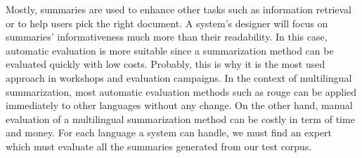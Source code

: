 Mostly, summaries are used to enhance other tasks such as information retrieval or to help users pick the right document. 
A system's designer will focus on summaries' informativeness much more than their readability. 
In this case, automatic evaluation is more suitable since a summarization method can be evaluated quickly with low costs.
Probably, this is why it is the most used approach in workshops and evaluation campaigns. 
In the context of multilingual summarization, most automatic evaluation methods such as \ac{rouge} can be applied immediately to other languages without any change.
On the other hand, manual evaluation of a multilingual summarization method can be costly in term of time and money. 
For each language a system can handle, we must find an expert which must evaluate all the summaries generated from our test corpus. 




